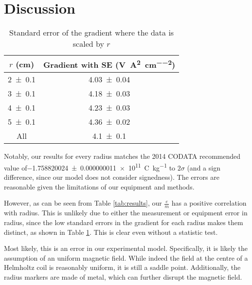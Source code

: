 \documentclass[a4paper]{scrartcl}
\begin{document}
\section{Discussion}
\begin{table}
    \centering
    \begin{tabular}{c | c}
        \(r\) (\si{\centi\metre}) & Gradient with SE (\si{\volt\per\ampere\squared\per\centi\metre\squared}) \\
        \hline
        \SI{2 \pm 0.1}{} & \SI{4.03 \pm 0.04}{} \\
        \SI{3 \pm 0.1}{} & \SI{4.18 \pm 0.03}{} \\
        \SI{4 \pm 0.1}{} & \SI{4.23 \pm 0.03}{} \\
        \SI{5 \pm 0.1}{} & \SI{4.36 \pm 0.02}{} \\
        \hline
        All & \SI{4.1 \pm 0.1}{}
    \end{tabular}
    \caption{Standard error of the gradient where the data is scaled by \(r\)}
    \label{tab:standard-error}
\end{table}

Notably, our results for every radius matches the 2014 CODATA recommended value of\linebreak\SI{-1.758820024 \pm 0.000000011e11}{\coulomb\per\kilo\gram} to \(2 \sigma\) (and a sign difference, since our model does not consider signedness). The errors are reasonable given the limitations of our equipment and methods.

However, as can be seen from Table \ref{tab:results}, our \(\frac{e}{m}\) has a positive correlation with radius. This is unlikely due to either the measurement or equipment error in radius, since the low standard errors in the gradient for each radius makes them distinct, as shown in Table \ref{tab:standard-error}. This is clear even without a statistic test.

Most likely, this is an error in our experimental model. Specifically, it is likely the assumption of an uniform magnetic field. While indeed the field at the centre of a Helmholtz coil is reasonably uniform, it is still a saddle point. Additionally, the radius markers are made of metal, which can further disrupt the magnetic field.
\end{document}
